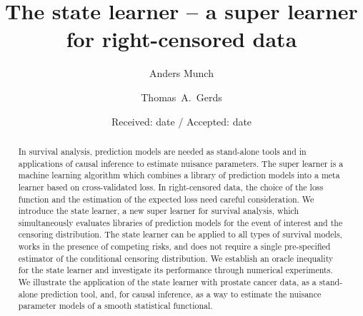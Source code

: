 \title{The state learner -- a super learner for right-censored data
}


\author{Anders Munch         \and
        Thomas~A.~Gerds %
}



\date{Received: date / Accepted: date}


\maketitle

\begin{abstract}
  In survival analysis, prediction models are needed as stand-alone tools and in
  applications of causal inference to estimate nuisance parameters. The super
  learner is a machine learning algorithm which combines a library of prediction
  models into a meta learner based on cross-validated loss. In right-censored
  data, the choice of the loss function and the estimation of the expected loss
  need careful consideration. We introduce the state learner, a new super
  learner for survival analysis, which simultaneously evaluates libraries of
  prediction models for the event of interest and the censoring distribution.
  The state learner can be applied to all types of survival models, works in the
  presence of competing risks, and does not require a single pre-specified
  estimator of the conditional censoring distribution. We establish an oracle
  inequality for the state learner and investigate its performance through
  numerical experiments. We illustrate the application of the state learner with
  prostate cancer data, as a stand-alone prediction tool, and, for causal
  inference, as a way to estimate the nuisance parameter models of a smooth
  statistical functional.

\end{abstract}

